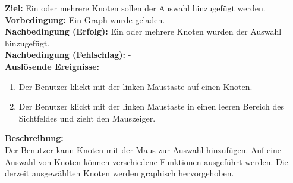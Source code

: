 \label{fa:selekt_knoten}
\textbf{Ziel:} Ein oder mehrere Knoten sollen der Auswahl hinzugefügt werden.\\
\textbf{Vorbedingung:} Ein Graph wurde geladen.\\
\textbf{Nachbedingung (Erfolg):} Ein oder mehrere Knoten wurden der Auswahl hinzugefügt.\\
\textbf{Nachbedingung (Fehlschlag):} -\\
\textbf{Auslösende Ereignisse:}
\begin{enumerate}[nolistsep, label=(\alph*)]
  \item Der Benutzer klickt mit der linken Maustaste auf einen Knoten.
  \item Der Benutzer klickt mit der linken Maustaste in einen leeren Bereich des Sichtfeldes und zieht den Mauszeiger.
\end{enumerate}
\textbf{Beschreibung:}\\
Der Benutzer kann Knoten mit der Maus zur Auswahl hinzufügen.
Auf eine Auswahl von Knoten können verschiedene Funktionen ausgeführt werden. %
Die derzeit ausgewählten Knoten werden graphisch hervorgehoben.\\


